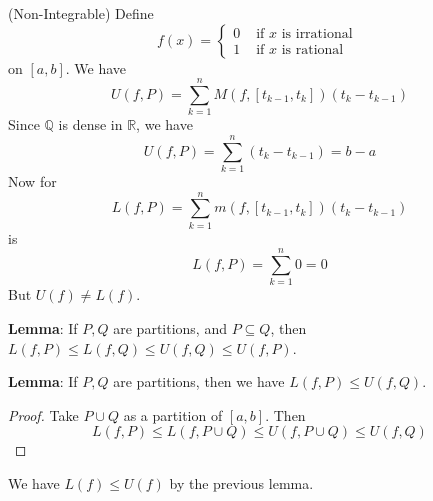 \documentclass{report}
\begin{document}
\begin{examples}
    \begin{example}
        (Non-Integrable) Define
            \begin{equation*}
                f(x) = \begin{cases}
                    0                     &\text{ if } x \text{ is irrational } \\
                    1 &\text{ if } x \text{ is rational}   
                \end{cases}
            \end{equation*}
        on $[a, b]$. We have   
            \begin{equation*}
                U(f, P) = \sum_{k = 1}^{n}M(f, [t_{k - 1}, t_{k}])(t_{k} - t_{k - 1})
            \end{equation*}
        Since $\mathbb{Q}$ is dense in $\mathbb{R}$, we have 
            \begin{equation*}
                U(f, P) = \sum_{k = 1}^{n}(t_{k} - t_{k - 1}) = b - a
            \end{equation*}
        Now for 
            \begin{equation*}
                L(f, P) = \sum_{k = 1}^{n}m(f, [t_{k - 1}, t_{k}])(t_{k} - t_{k - 1})
            \end{equation*}
        is
            \begin{equation*}
                L(f, P) = \sum_{k = 1}^{n}0 = 0
            \end{equation*}
        But $U(f) \neq L(f)$.
    \end{example}
\end{examples}

\textbf{Lemma}: If $P, Q$ are partitions, and $P \subseteq Q$, then $L(f, P) \leq L(f, Q) \leq U(f, Q) \leq U(f, P)$.

\textbf{Lemma}: If $P, Q$ are partitions, then we have $L(f, P) \leq U(f, Q)$.
    \begin{proof}
        Take $P \cup Q$ as a partition of $[a, b]$. Then 
            \begin{equation*}
                L(f, P) \leq L(f, P \cup Q) \leq U(f, P \cup Q) \leq U(f, Q)
            \end{equation*}
    \end{proof}

\begin{theorem}{32.4}
    We have $L(f) \leq U(f)$ by the previous lemma.
\end{theorem}
\end{document}
